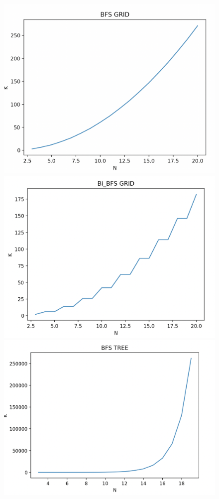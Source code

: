 \documentclass[12pt]{article}
\begin{document}
\begin{enumerate}
\begin{figure}
\begin{center}
\includegraphics[scale=0.4]{plot1.png} 
\includegraphics[scale=0.4]{plot2.png} 
\includegraphics[scale=0.4]{plot3.png} 
\end{center}
\end{figure}


\end{enumerate}
\end{document}

